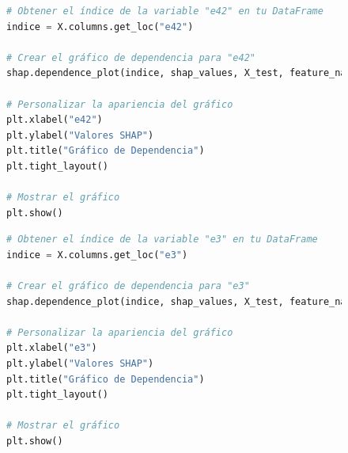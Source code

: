 \begin{figure}[H]
    \centering
    \begin{minipage}{0.48\textwidth}
        \begin{lstlisting}[language=Python, caption=Grafico de dependencia e42, label=lst:grafDepe42]
# Obtener el índice de la variable "e42" en tu DataFrame
indice = X.columns.get_loc("e42")

# Crear el gráfico de dependencia para "e42"
shap.dependence_plot(indice, shap_values, X_test, feature_names=X.columns, show=False)

# Personalizar la apariencia del gráfico
plt.xlabel("e42")
plt.ylabel("Valores SHAP")
plt.title("Gráfico de Dependencia")
plt.tight_layout()

# Mostrar el gráfico
plt.show()
        \end{lstlisting}
    \end{minipage}
    \hfill
    \begin{minipage}{0.48\textwidth}
        \begin{lstlisting}[language=Python, caption=Grafico de dependencia e3, label=lst:grafDepe3]
# Obtener el índice de la variable "e3" en tu DataFrame
indice = X.columns.get_loc("e3")

# Crear el gráfico de dependencia para "e3"
shap.dependence_plot(indice, shap_values, X_test, feature_names=X.columns, show=False)

# Personalizar la apariencia del gráfico
plt.xlabel("e3")
plt.ylabel("Valores SHAP")
plt.title("Gráfico de Dependencia")
plt.tight_layout()

# Mostrar el gráfico
plt.show()
        \end{lstlisting}
    \end{minipage}
\end{figure}

